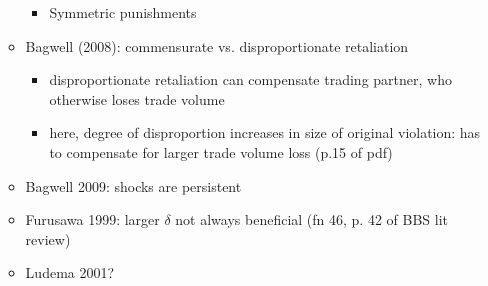 \documentclass[12pt]{article}
\begin{document}
\begin{itemize}
\begin{itemize}
\begin{itemize}
					\item Symmetric punishments
				\end{itemize}
			\item Bagwell (2008): commensurate vs. disproportionate retaliation
				\begin{itemize}
					\item disproportionate retaliation can compensate trading partner, who otherwise loses trade volume
					\item here, degree of disproportion increases in size of original violation: has to compensate for larger trade volume loss (p.15 of pdf)
				\end{itemize}
			\item Bagwell 2009: shocks are persistent
			\item Furusawa 1999: larger $\delta$ not always beneficial (fn 46, p. 42 of BBS lit review)
			\item Ludema 2001?
		\end{itemize}
	\end{itemize}	
\end{document}
